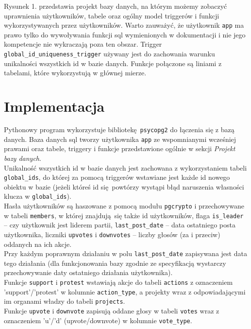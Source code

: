 \documentclass[a4paper,10pt]{article}
\begin{document}
Rysunek 1. przedstawia projekt bazy danych, na którym możemy zobaczyć uprawnienia użytkowników, tabele oraz ogólny model triggerów i funkcji wykorzystywanych przez użytkowników.
Warto zauważyć, że użytkownik \texttt{app} ma prawo tylko do wywoływania funkcji sql wymienionych w dokumentacji i nie jego kompetencje nie wykraczają poza ten obszar.
Trigger \texttt{global\_id\_uniqueness\_trigger} używany jest do zachowania warunku unikalności wszystkich id w bazie danych. Funkcje połączone są liniami z tabelami, które wykorzystują w głównej mierze.

\newpage

\section{Implementacja}
\indent Pythonowy program wykorzystuje bibliotekę \texttt{psycopg2} do łączenia się z bazą danych. Baza danych sql tworzy użytkownika \texttt{app} ze wspomnianymi wcześniej prawami oraz tabele, triggery i funkcje przedstawione ogólnie w sekcji \textit{Projekt bazy danych}. \\
\indent Unikalność wszystkich id w bazie danych jest zachowana z wykorzystaniem tabeli \texttt{global\_ids}, do której za pomocą triggerów wstawiane jest każde id nowego obiektu w bazie (jeżeli któreś id się powtórzy wystąpi błąd naruszenia własności klucza w \texttt{global\_ids}). \\
\indent Hasła użytkowników są haszowane z pomocą modułu \texttt{pgcrypto} i przechowywane w tabeli \texttt{members}, w której znajdują się także id użytkowników, flaga \texttt{is\_leader} -- czy użytkownik jest liderem partii, \texttt{last\_post\_date} -- data ostatniego posta użytkownika, liczniki \texttt{upvotes} i \texttt{downvotes} -- liczby głosów (za i przeciw) oddanych na ich akcje. \\
\indent Przy każdym poprawnym działaniu w polu \texttt{last\_post\_date} zapisywana jest data tego działania (dla funkcjonowania bazy zgodnie ze specyfikacją wystarczy przechowywanie daty ostatniego działania użytkownika). \\
\indent Funkcje \texttt{support} i \texttt{protest} wstawiają akcje do tabeli \texttt{actions} z oznaczeniem 'support'/'protest' w kolumnie \texttt{action\_type}, a projekty wraz z odpowiadającymi im organami władzy do tabeli \texttt{projects}. \\
\indent Funkcje \texttt{upvote} i \texttt{downvote} zapisują oddane głosy w tabeli \texttt{votes} wraz z oznaczeniem 'u'/'d' (upvote/downvote) w kolumnie \texttt{vote\_type}. \\
\end{document}
